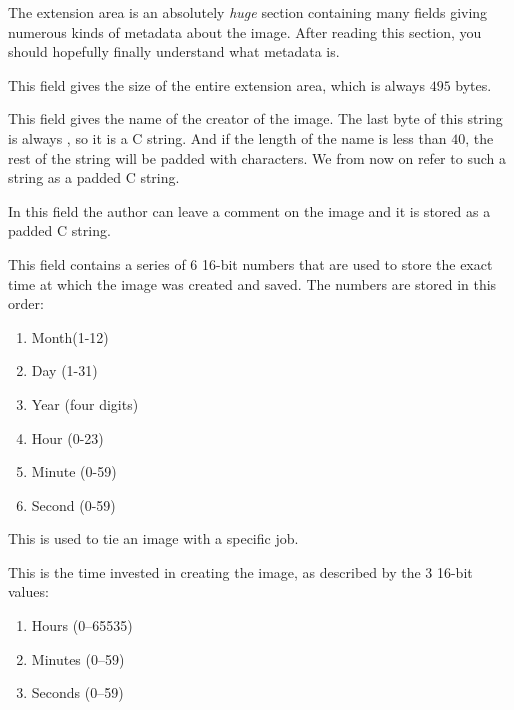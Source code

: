 The extension area is an absolutely \textit{huge} section containing
many fields giving numerous kinds of metadata about the image. After
reading this section, you should hopefully finally understand what
metadata is.


This field gives the size of the entire extension area, which is
always $495$ bytes.


This field gives the name of the creator of the image. The last byte
of this string is always \nullm, so it is a C string. And if the
length of the name is less than $40$, the rest of the string will be
padded with \nullm characters. We from now on refer to such a string
as a \nullm padded C string.


In this field the author can leave a comment on the image and it is
stored as a \nullm padded C string.


This field contains a series of 6 16-bit numbers that are used to
store the exact time at which the image was created and saved. The
numbers are stored in this order:

\begin{enumerate}
\item Month(1-12)
\item Day (1-31)
\item Year (four digits)
\item Hour (0-23)
\item Minute (0-59)
\item Second (0-59)
\end{enumerate}


This is used to tie an image with a specific job.


This is the time invested in creating the image, as described by the 3
16-bit values:

\begin{enumerate}
\item Hours (0--65535)
\item Minutes (0--59)
\item Seconds (0--59)
\end{enumerate}


